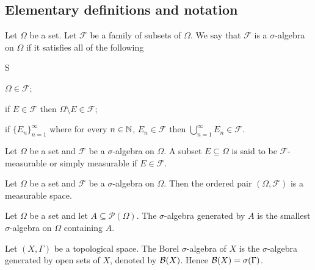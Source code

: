 \subsection{Elementary definitions and notation}
\begin{definition}
Let $\Omega$ be a set. Let $\mathcal{F}$ be  a family of subsets of $\Omega$. We say that $\mathcal{F}$ is a $\sigma$-algebra on $\Omega$ if it satisfies all of the following
\begin{axioms}{S}
  \item \label{defn:measure:salg:S1} $\Omega \in \mathcal{F}$;
  \item \label{defn:measure:salg:S2} if $E \in \mathcal{F}$ then $\Omega \setminus E \in \mathcal{F}$;
  \item \label{defn:measure:salg:S3} if $\{ E_n \}_{n=1}^\infty$ where for every $n \in {\mathbb N}$, $E_n \in \mathcal{F}$ then $\bigcup_{n=1}^\infty E_n \in \mathcal{F}$.
\end{axioms}
\end{definition}
\begin{definition}
Let $\Omega$ be a set and $\mathcal{F}$ be a $\sigma$-algebra on $\Omega$. A subset $E \subseteq \Omega$ is said to be $\mathcal{F}$-measurable or simply measurable if $E \in \mathcal{F}$.
\end{definition}
\begin{definition}
Let $\Omega$ be a set and $\mathcal{F}$ be a $\sigma$-algebra on $\Omega$. Then the ordered pair $(\Omega, \mathcal{F})$ is a measurable space.
\end{definition}

\begin{definition}
Let $\Omega$ be a set and let $A \subseteq \mathcal{P}(\Omega)$. The $\sigma$-algebra generated by $A$ is the smallest $\sigma$-algebra on $\Omega$ containing $A$.
\end{definition}

\begin{definition}
Let $(X,\Gamma)$ be a topological space. The Borel $\sigma$-algebra of $X$ is the $\sigma$-algebra generated by open sets of $X$, denoted by ${\mathcal B}(X)$.
Hence ${\mathcal B}(X) = \sigma(\Gamma)$.
\end{definition}

